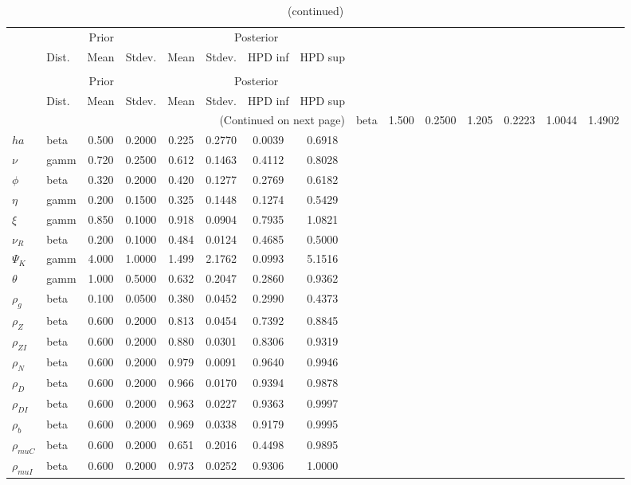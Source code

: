  
\begin{center}
\begin{longtable}{llcccccc} 
\caption{Results from Metropolis-Hastings (parameters)}
 \label{Table:MHPosterior:1}\\
\toprule 
  & \multicolumn{3}{c}{Prior}  &  \multicolumn{4}{c}{Posterior} \\
  \cmidrule(r{.75em}){2-4} \cmidrule(r{.75em}){5-8}
  & Dist. & Mean  & Stdev. & Mean & Stdev. & HPD inf & HPD sup\\
\midrule \endfirsthead 
\caption{(continued)}\\\toprule 
  & \multicolumn{3}{c}{Prior}  &  \multicolumn{4}{c}{Posterior} \\
  \cmidrule(r{.75em}){2-4} \cmidrule(r{.75em}){5-8}
  & Dist. & Mean  & Stdev. & Mean & Stdev. & HPD inf & HPD sup\\
\midrule \endhead 
\bottomrule \multicolumn{8}{r}{(Continued on next page)} \endfoot 
\bottomrule \endlastfoot 
${\sigma}$ & beta &   1.500 & 0.2500 &   1.205& 0.2223 &  1.0044 &  1.4902 \\ 
${ha}$ & beta &   0.500 & 0.2000 &   0.225& 0.2770 &  0.0039 &  0.6918 \\ 
$\nu$ & gamm &   0.720 & 0.2500 &   0.612& 0.1463 &  0.4112 &  0.8028 \\ 
${\phi}$ & beta &   0.320 & 0.2000 &   0.420& 0.1277 &  0.2769 &  0.6182 \\ 
${\eta}$ & gamm &   0.200 & 0.1500 &   0.325& 0.1448 &  0.1274 &  0.5429 \\ 
$\xi$ & gamm &   0.850 & 0.1000 &   0.918& 0.0904 &  0.7935 &  1.0821 \\ 
${\nu_R}$ & beta &   0.200 & 0.1000 &   0.484& 0.0124 &  0.4685 &  0.5000 \\ 
${\Psi_{K}}$ & gamm &   4.000 & 1.0000 &   1.499& 2.1762 &  0.0993 &  5.1516 \\ 
${\theta}$ & gamm &   1.000 & 0.5000 &   0.632& 0.2047 &  0.2860 &  0.9362 \\ 
${\rho_g}$ & beta &   0.100 & 0.0500 &   0.380& 0.0452 &  0.2990 &  0.4373 \\ 
${\rho_Z}$ & beta &   0.600 & 0.2000 &   0.813& 0.0454 &  0.7392 &  0.8845 \\ 
${\rho_{ZI}}$ & beta &   0.600 & 0.2000 &   0.880& 0.0301 &  0.8306 &  0.9319 \\ 
${\rho_N}$ & beta &   0.600 & 0.2000 &   0.979& 0.0091 &  0.9640 &  0.9946 \\ 
${\rho_D}$ & beta &   0.600 & 0.2000 &   0.966& 0.0170 &  0.9394 &  0.9878 \\ 
${\rho_{DI}}$ & beta &   0.600 & 0.2000 &   0.963& 0.0227 &  0.9363 &  0.9997 \\ 
${\rho_b}$ & beta &   0.600 & 0.2000 &   0.969& 0.0338 &  0.9179 &  0.9995 \\ 
${\rho_{muC}}$ & beta &   0.600 & 0.2000 &   0.651& 0.2016 &  0.4498 &  0.9895 \\ 
${\rho_{muI}}$ & beta &   0.600 & 0.2000 &   0.973& 0.0252 &  0.9306 &  1.0000 \\ 
\end{longtable}
 \end{center}
